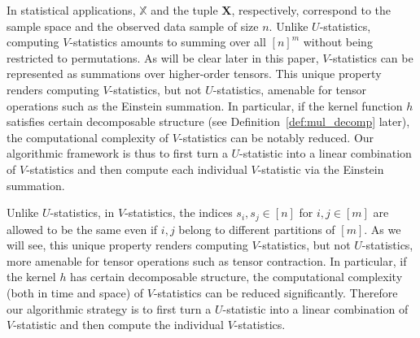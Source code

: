 \documentclass[12pt]{article}
\theoremstyle{plain}
\theoremstyle{definition}
\newtheorem{remark}{Remark}
\newcommand{\sper}{\sigma}
\newcommand{\ustat}{\mathbb{U}}
\newcommand{\vstat}{\mathbb{V}}
\newcommand{\ustatp}[2]{\ustat(#1,#2)}
\newcommand{\vstatp}[2]{\vstat(#1,#2)}
\newcommand{\Lin}[1]{{\color{purple}{#1}}}
\def\bbX{\mathbb{X}}
\begin{document}
\begin{bibunit}[agsm]
In statistical applications, $\bbX$ and the tuple $\bm{X}$, respectively, correspond to the sample space and the observed data sample of size $n$. Unlike $U$-statistics, computing $V$-statistics amounts to summing over all $[n]^{m}$ without being restricted to permutations. As will be clear later in this paper, $V$-statistics can be represented as summations over higher-order tensors. This unique property renders computing $V$-statistics, but not $U$-statistics, amenable for tensor operations such as the Einstein summation. In particular, if the kernel function $h$ satisfies certain decomposable structure (see Definition~\ref{def:mul_decomp} later), the computational complexity of $V$-statistics can be notably reduced.
Our algorithmic framework is thus to first turn a $U$-statistic into a linear combination of $V$-statistics and then compute each individual $V$-statistic via the Einstein summation.

\iffalse
Unlike $U$-statistics, in $V$-statistics, the indices $s_{i}, s_{j} \in [n]$ for $i, j \in [m]$ are allowed to be the same even if $i, j$ belong to different partitions of $[m]$. As we will see, this unique property renders computing $V$-statistics, but not $U$-statistics, more amenable for tensor operations such as tensor contraction. In particular, if the kernel $h$ has certain decomposable structure, the computational complexity (both in time and space) of $V$-statistics can be reduced significantly. Therefore our algorithmic strategy is to first turn a $U$-statistic into a linear combination of $V$-statistic and then compute the individual $V$-statistics.


\end{bibunit}
\end{document}
